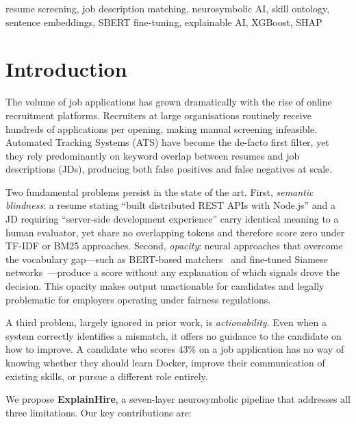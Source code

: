 \documentclass[conference]{IEEEtran}
\begin{document}
\begin{IEEEkeywords}
resume screening, job description matching, neurosymbolic AI, skill ontology,
sentence embeddings, SBERT fine-tuning, explainable AI, XGBoost, SHAP
\end{IEEEkeywords}

\section{Introduction}

The volume of job applications has grown dramatically with the rise of online
recruitment platforms. Recruiters at large organisations routinely receive
hundreds of applications per opening, making manual screening infeasible.
Automated Tracking Systems (ATS) have become the de-facto first filter, yet
they rely predominantly on keyword overlap between resumes and job descriptions
(JDs), producing both false positives and false negatives at scale.

Two fundamental problems persist in the state of the art. First,
\textit{semantic blindness}: a resume stating ``built distributed REST APIs
with Node.js'' and a JD requiring ``server-side development experience'' carry
identical meaning to a human evaluator, yet share no overlapping tokens and
therefore score zero under TF-IDF or BM25 approaches. Second,
\textit{opacity}: neural approaches that overcome the vocabulary
gap---such as BERT-based matchers~\cite{li2020competence} and fine-tuned
Siamese networks~\cite{lavi2021consultantbert}---produce a score without any
explanation of which signals drove the decision. This opacity makes output
unactionable for candidates and legally problematic for employers operating
under fairness regulations.

A third problem, largely ignored in prior work, is \textit{actionability}.
Even when a system correctly identifies a mismatch, it offers no guidance to
the candidate on how to improve. A candidate who scores 43\% on a job
application has no way of knowing whether they should learn Docker, improve
their communication of existing skills, or pursue a different role entirely.

We propose \textbf{ExplainHire}, a seven-layer neurosymbolic pipeline that
addresses all three limitations. Our key contributions are:
\end{document}
